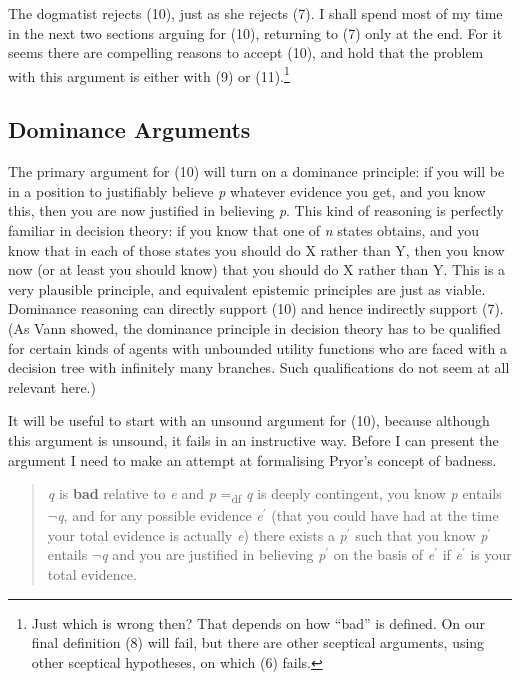 The dogmatist rejects (10), just as she rejects (7). I shall spend most
of my time in the next two sections arguing for (10), returning to (7)
only at the end. For it seems there are compelling reasons to accept
(10), and hold that the problem with this argument is either with (9) or
(11).\footnote{Just which is wrong then? That depends on how ``bad'' is
  defined. On our final definition (8) will fail, but there are other
  sceptical arguments, using other sceptical hypotheses, on which (6)
  fails.}

\hypertarget{dominance-arguments}{%
\subsection{Dominance Arguments}\label{dominance-arguments}}

The primary argument for (10) will turn on a dominance principle: if you
will be in a position to justifiably believe \emph{p} whatever evidence
you get, and you know this, then you are now justified in believing
\emph{p}. This kind of reasoning is perfectly familiar in decision
theory: if you know that one of \emph{n} states obtains, and you know
that in each of those states you should do X rather than Y, then you
know now (or at least you should know) that you should do X rather than
Y. This is a very plausible principle, and equivalent epistemic
principles are just as viable. Dominance reasoning can directly support
(10) and hence indirectly support (7). (As Vann \citet{McGee1999}
showed, the dominance principle in decision theory has to be qualified
for certain kinds of agents with unbounded utility functions who are
faced with a decision tree with infinitely many branches. Such
qualifications do not seem at all relevant here.)

It will be useful to start with an unsound argument for (10), because
although this argument is unsound, it fails in an instructive way.
Before I can present the argument I need to make an attempt at
formalising Pryor's concept of badness.

\begin{quote}
\emph{q} is \textbf{bad} relative to \emph{e} and \emph{p}
=\textsubscript{df} \emph{q} is deeply contingent, you know \emph{p}
entails \(\neg\)\emph{q}, and for any possible evidence
\emph{e}\(^\prime\) (that you could have had at the time your total
evidence is actually \emph{e}) there exists a \emph{p}\(^\prime\) such
that you know \emph{p}\(^\prime\) entails \(\neg\)\emph{q} and you are
justified in believing \emph{p}\(^\prime\) on the basis of
\emph{e}\(^\prime\) if \emph{e}\(^\prime\) is your total evidence.
\end{quote}

